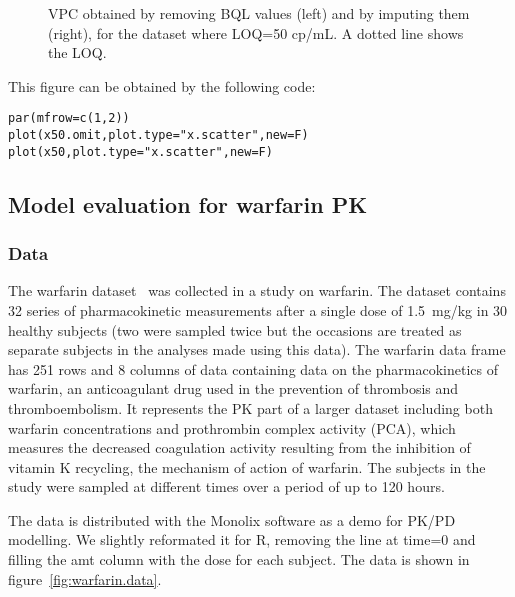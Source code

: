\begin{figure}[!h]
\par\kern -1cm
\begin{center}
\end{center}
\par\kern -7cm
\caption{VPC obtained by removing BQL values (left) and by imputing them (right), for the dataset where LOQ=50 cp/mL. A dotted line shows the LOQ.}\label{fig:x50.xscatter}
\end{figure}

This figure can be obtained by the following code:
\begin{verbatim}
par(mfrow=c(1,2))
plot(x50.omit,plot.type="x.scatter",new=F)
plot(x50,plot.type="x.scatter",new=F)
\end{verbatim} 

\clearpage
\subsection{Model evaluation for warfarin PK} \label{sec:warfarin}

\subsubsection{Data}

\hskip 18pt The warfarin dataset~\cite{OReilly68} was collected in a study on warfarin. The dataset contains 32 series of pharmacokinetic measurements after a single dose of 1.5~mg/kg in 30 healthy subjects (two were sampled twice but the occasions are treated as separate subjects in the analyses made using this data). 
The {\sf warfarin} data frame has 251 rows and 8 columns of data containing data on the pharmacokinetics of warfarin, an anticoagulant drug used in the prevention of thrombosis and thromboembolism. It represents the PK part of a larger dataset including both warfarin concentrations and prothrombin complex activity (PCA), which measures the decreased coagulation  activity resulting from the inhibition of vitamin K recycling, the mechanism of  action of warfarin. The subjects in the study were sampled at different times over a period of up to 120 hours.

The data is distributed with the {\sf Monolix} software as a demo for PK/PD modelling. We slightly reformated it for R, removing the line at time=0 and filling the {\sf amt} column with the dose for each subject. The data is shown in figure~\ref{fig:warfarin.data}.

